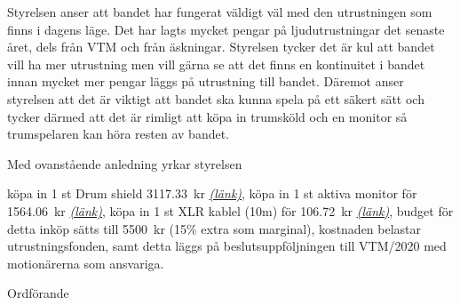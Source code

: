 \documentclass[../_main/handlingar.tex]{subfiles}
\begin{document}
\motionssvar

Styrelsen anser att bandet har fungerat väldigt väl med den utrustningen som finns i dagens läge. Det har lagts mycket pengar på ljudutrustningar det senaste året, dels från VTM och från äskningar. Styrelsen tycker det är kul att bandet vill ha mer utrustning men vill gärna se att det finns en kontinuitet i bandet innan mycket mer pengar läggs på utrustning till bandet. 
Däremot anser styrelsen att det är viktigt att bandet ska kunna spela på ett säkert sätt och tycker därmed att det är rimligt att köpa in trumsköld och en monitor så trumspelaren kan höra resten av bandet.


Med ovanstående anledning yrkar styrelsen 

\begin{attsatser}
    \att köpa in 1 st Drum shield \SI{3117.33}{kr} \href{https://www.thomann.de/se/the_t.akustik_ds4_4_drum_shield.htm}{\textit{(länk)}},
    \att köpa in 1 st aktiva monitor för \SI{1564.06}{kr} \href{https://www.thomann.de/se/behringer_f1220_eurolive.htm}{\textit{(länk)}},
    \att köpa in 1 st XLR kablel (10m) för \SI{106.72}{kr} \href{https://www.thomann.de/se/pro_snake_tpm_10.htm}{\textit{(länk)}},
    \att budget för detta inköp sätts till \SI{5500}{kr} (15\% extra som marginal),
    \att kostnaden belastar utrustningsfonden, samt
    \att detta läggs på beslutsuppföljningen till VTM/2020 med motionärerna som ansvariga.
\end{attsatser}

\begin{signatures}{1}
    \ist
    \signature{\ordf}{Ordförande}
\end{signatures}
\end{document}
